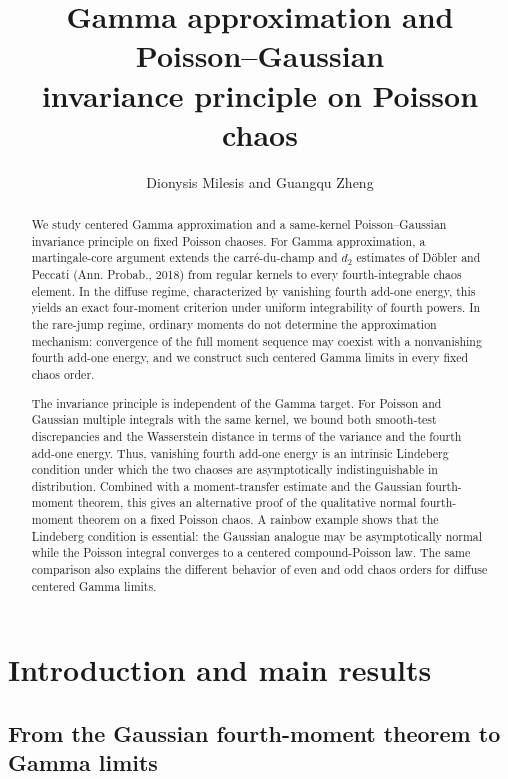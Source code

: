 \documentclass[letterpaper,11pt,reqno]{amsart}
\title[Gamma approximation and Poisson--Gaussian invariance]
{Gamma approximation and Poisson--Gaussian \\ invariance principle  on Poisson chaos}
\author[D.~Milesis and G.~Zheng]{Dionysis Milesis and Guangqu Zheng}
\numberwithin{equation}{section}
\theoremstyle{plain}
\theoremstyle{definition}
\theoremstyle{remark}
\begin{document}
\begin{abstract}
We study centered Gamma approximation and a same-kernel
Poisson--Gaussian invariance principle on fixed Poisson chaoses.  For
Gamma approximation, a martingale-core argument extends the
carr\'e-du-champ and $d_2$ estimates of D\"obler and Peccati  (Ann. Probab., 2018)
from
regular kernels to every fourth-integrable chaos element.  In the
diffuse regime, characterized by vanishing fourth add-one energy, this
yields an exact four-moment criterion under uniform integrability of
fourth powers.  In the rare-jump regime, ordinary moments do not
determine the approximation mechanism: convergence of the full moment
sequence may coexist with a nonvanishing fourth add-one energy, and we
construct such centered Gamma limits in every fixed chaos order.

The invariance principle is independent of the Gamma target.  For
Poisson and Gaussian multiple integrals with the same kernel, we bound
both smooth-test discrepancies and the Wasserstein distance in terms of
the variance and the fourth add-one energy.  Thus, vanishing fourth
add-one energy is an intrinsic Lindeberg condition under which the two
chaoses are asymptotically indistinguishable in distribution.  
Combined with a moment-transfer estimate and the Gaussian
fourth-moment theorem, this gives an alternative proof of the
qualitative normal fourth-moment theorem on a fixed Poisson chaos.  A
rainbow example shows that the Lindeberg condition is essential: the
Gaussian analogue may be asymptotically normal while the Poisson
integral converges to a centered compound-Poisson law.  The same
comparison also explains the different behavior of even and odd chaos
orders for diffuse centered Gamma limits.


\end{abstract}

\maketitle

\section{Introduction and main results}
\label{SEC1}

\subsection{From the Gaussian fourth-moment theorem to Gamma limits}
\label{SEC_11}
\end{document}
